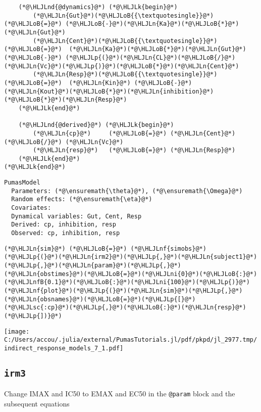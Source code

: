 \documentclass[12pt,a4paper]{article}
\newcommand{\HLJLk}[1]{\textcolor[RGB]{148,91,176}{\textbf{#1}}}
\newcommand{\HLJLn}[1]{#1}
\newcommand{\HLJLnd}[1]{\textcolor[RGB]{214,102,97}{#1}}
\newcommand{\HLJLnf}[1]{\textcolor[RGB]{66,102,213}{#1}}
\newcommand{\HLJLsc}[1]{\textcolor[RGB]{201,61,57}{#1}}
\newcommand{\HLJLnfB}[1]{\textcolor[RGB]{59,151,46}{#1}}
\newcommand{\HLJLni}[1]{\textcolor[RGB]{59,151,46}{#1}}
\newcommand{\HLJLoB}[1]{\textcolor[RGB]{102,102,102}{\textbf{#1}}}
\newcommand{\HLJLp}[1]{#1}
\begin{document}
\begin{lstlisting}
    (*@\HLJLnd{@dynamics}@*) (*@\HLJLk{begin}@*)
        (*@\HLJLn{Gut}@*)(*@\HLJLoB{{\textquotesingle}}@*)    (*@\HLJLoB{=}@*) (*@\HLJLoB{-}@*)(*@\HLJLn{Ka}@*)(*@\HLJLoB{*}@*)(*@\HLJLn{Gut}@*)
        (*@\HLJLn{Cent}@*)(*@\HLJLoB{{\textquotesingle}}@*)   (*@\HLJLoB{=}@*)  (*@\HLJLn{Ka}@*)(*@\HLJLoB{*}@*)(*@\HLJLn{Gut}@*) (*@\HLJLoB{-}@*) (*@\HLJLp{(}@*)(*@\HLJLn{CL}@*)(*@\HLJLoB{/}@*)(*@\HLJLn{Vc}@*)(*@\HLJLp{)}@*)(*@\HLJLoB{*}@*)(*@\HLJLn{Cent}@*)
        (*@\HLJLn{Resp}@*)(*@\HLJLoB{{\textquotesingle}}@*)   (*@\HLJLoB{=}@*)  (*@\HLJLn{Kin}@*) (*@\HLJLoB{-}@*) (*@\HLJLn{Kout}@*)(*@\HLJLoB{*}@*)(*@\HLJLn{inhibition}@*)(*@\HLJLoB{*}@*)(*@\HLJLn{Resp}@*)
    (*@\HLJLk{end}@*)

    (*@\HLJLnd{@derived}@*) (*@\HLJLk{begin}@*)
        (*@\HLJLn{cp}@*)     (*@\HLJLoB{=}@*) (*@\HLJLn{Cent}@*) (*@\HLJLoB{/}@*) (*@\HLJLn{Vc}@*)
        (*@\HLJLn{resp}@*)   (*@\HLJLoB{=}@*) (*@\HLJLn{Resp}@*)
    (*@\HLJLk{end}@*)
(*@\HLJLk{end}@*)
\end{lstlisting}

\begin{lstlisting}
PumasModel
  Parameters: (*@\ensuremath{\theta}@*), (*@\ensuremath{\Omega}@*)
  Random effects: (*@\ensuremath{\eta}@*)
  Covariates: 
  Dynamical variables: Gut, Cent, Resp
  Derived: cp, inhibition, resp
  Observed: cp, inhibition, resp
\end{lstlisting}


\begin{lstlisting}
(*@\HLJLn{sim}@*) (*@\HLJLoB{=}@*) (*@\HLJLnf{simobs}@*)(*@\HLJLp{(}@*)(*@\HLJLn{irm2}@*)(*@\HLJLp{,}@*)(*@\HLJLn{subject1}@*)(*@\HLJLp{,}@*)(*@\HLJLn{param}@*)(*@\HLJLp{,}@*)(*@\HLJLn{obstimes}@*)(*@\HLJLoB{=}@*)(*@\HLJLni{0}@*)(*@\HLJLoB{:}@*)(*@\HLJLnfB{0.1}@*)(*@\HLJLoB{:}@*)(*@\HLJLni{100}@*)(*@\HLJLp{)}@*)
(*@\HLJLnf{plot}@*)(*@\HLJLp{(}@*)(*@\HLJLn{sim}@*)(*@\HLJLp{,}@*) (*@\HLJLn{obsnames}@*)(*@\HLJLoB{=}@*)(*@\HLJLp{[}@*)(*@\HLJLsc{:cp}@*)(*@\HLJLp{,}@*)(*@\HLJLoB{:}@*)(*@\HLJLn{resp}@*)(*@\HLJLp{])}@*)
\end{lstlisting}

\texttt{[image: C:/Users/accou/.julia/external/PumasTutorials.jl/pdf/pkpd/jl\_2977.tmp/indirect\_response\_models\_7\_1.pdf]}

\subsection{\texttt{irm3}}
Change IMAX and IC50 to EMAX and EC50 in the \texttt{@param} block and the subsequent equations
\end{document}

